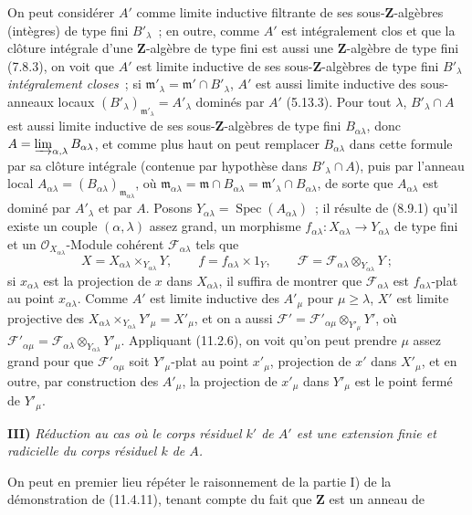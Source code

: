 On peut considérer $A'$ comme limite inductive filtrante de ses
sous-$\mathbf Z$-algèbres (intègres) de type fini $B'_{\lambda}$~; en outre,
comme $A'$ est intégralement clos et que la clôture intégrale d'une
$\mathbf Z$-algèbre de type fini est aussi une $\mathbf Z$-algèbre de type fini
(7.8.3), on voit que $A'$ est limite inductive de ses sous-$\mathbf Z$-algèbres
de type fini $B'_{\lambda}$ \emph{intégralement closes}~; si
$\mathfrak m'_{\lambda}=\mathfrak m'\cap B'_{\lambda}$, $A'$ est aussi limite
inductive des sous-anneaux locaux
$(B'_{\lambda})_{\mathfrak m'_{\lambda}}=A'_{\lambda}$ dominés par $A'$
(5.13.3). Pour tout $\lambda$, $B'_{\lambda}\cap A$ est aussi limite inductive
de ses sous-$\mathbf Z$-algèbres de type fini $B_{\alpha\lambda}$, donc
$A=\varinjlim_{\alpha,\lambda}B_{\alpha\lambda}$, et comme plus haut on peut
remplacer $B_{\alpha\lambda}$ dans cette formule par sa clôture intégrale
(contenue par hypothèse dans $B'_{\lambda}\cap A$), puis par l'anneau local
$A_{\alpha\lambda}=(B_{\alpha\lambda})_{\mathfrak m_{\alpha\lambda}}$, où
$\mathfrak m_{\alpha\lambda}=\mathfrak m\cap B_{\alpha\lambda}
=\mathfrak m'_{\lambda}\cap B_{\alpha\lambda}$, de sorte que
$A_{\alpha\lambda}$ est dominé par $A'_{\lambda}$ et par $A$. Posons
$Y_{\alpha\lambda}=\operatorname{Spec}(A_{\alpha\lambda})$~; il résulte de
(8.9.1) qu'il existe un couple $(\alpha,\lambda)$ assez grand, un morphisme
$f_{\alpha\lambda}:X_{\alpha\lambda}\to Y_{\alpha\lambda}$ de type fini et un
$\mathcal O_{X_{\alpha\lambda}}$-Module cohérent $\mathcal F_{\alpha\lambda}$
tels que
\[
X=X_{\alpha\lambda}\times_{Y_{\alpha\lambda}}Y,
\qquad f=f_{\alpha\lambda}\times1_Y,
\qquad \mathcal F=\mathcal F_{\alpha\lambda}\otimes_{Y_{\alpha\lambda}}Y~;
\]
si $x_{\alpha\lambda}$ est la projection de $x$ dans $X_{\alpha\lambda}$, il
suffira de montrer que $\mathcal F_{\alpha\lambda}$ est
$f_{\alpha\lambda}$-plat au point $x_{\alpha\lambda}$. Comme $A'$ est limite
inductive des $A'_{\mu}$ pour $\mu\geq\lambda$, $X'$ est limite projective des
$X_{\alpha\lambda}\times_{Y_{\alpha\lambda}}Y'_{\mu}=X'_{\mu}$, et on a aussi
$\mathcal F'=\mathcal F'_{\alpha\mu}\otimes_{Y'_{\mu}}Y'$, où
$\mathcal F'_{\alpha\mu}
=\mathcal F_{\alpha\lambda}\otimes_{Y_{\alpha\lambda}}Y'_{\mu}$.
Appliquant (11.2.6), on voit qu'on peut prendre $\mu$ assez grand pour que
$\mathcal F'_{\alpha\mu}$ soit $Y'_{\mu}$-plat au point $x'_{\mu}$, projection
de $x'$ dans $X'_{\mu}$, et en outre, par construction des $A'_{\mu}$, la
projection de $x'_{\mu}$ dans $Y'_{\mu}$ est le point fermé de $Y'_{\mu}$.

\medskip
\noindent\textbf{III)} \emph{Réduction au cas où le corps résiduel $k'$ de
$A'$ est une extension finie et radicielle du corps résiduel $k$ de $A$.}

On peut en premier lieu répéter le raisonnement de la partie I) de la
démonstration de (11.4.11), tenant compte du fait que $\mathbf Z$ est un anneau
de

